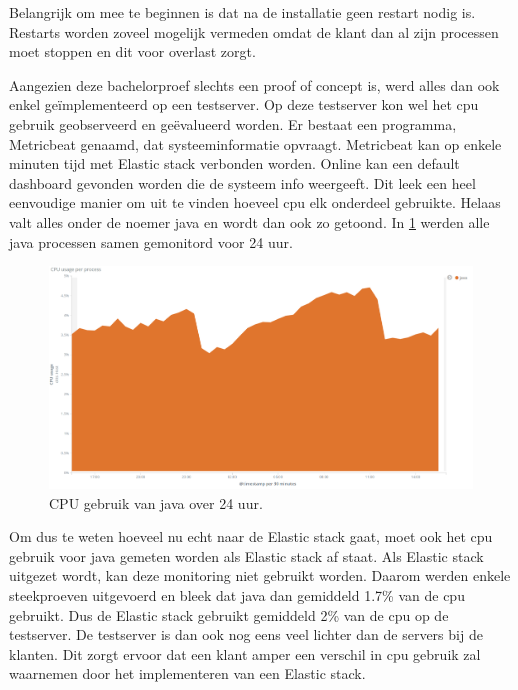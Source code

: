 Belangrijk om mee te beginnen is dat na de installatie geen restart nodig is. Restarts worden zoveel mogelijk vermeden omdat de klant dan al zijn processen moet stoppen en dit voor overlast zorgt.

Aangezien deze bachelorproef slechts een proof of concept is, werd alles dan ook enkel geïmplementeerd op een testserver. Op deze testserver kon wel het cpu gebruik geobserveerd en geëvalueerd worden. 
Er bestaat een programma, Metricbeat genaamd, dat systeeminformatie opvraagt. Metricbeat kan op enkele minuten tijd met Elastic stack verbonden worden. Online kan een default dashboard gevonden worden die de systeem info weergeeft. Dit leek een heel eenvoudige manier om uit te vinden hoeveel cpu elk onderdeel gebruikte. Helaas valt alles onder de noemer java en wordt dan ook zo getoond.
In \ref{fig:java} werden alle java processen samen gemonitord voor 24 uur. 

\begin{figure}[h]
	\includegraphics[width=16cm]{img/java1}
	\caption{CPU gebruik van java over 24 uur.}
	\label{fig:java}
\end{figure}

Om dus te weten hoeveel nu echt naar de Elastic stack gaat, moet ook het cpu gebruik voor java gemeten worden als Elastic stack af staat.
Als Elastic stack uitgezet wordt, kan deze monitoring niet gebruikt worden. 
Daarom werden enkele steekproeven uitgevoerd en bleek dat java dan gemiddeld 1.7\% van de cpu gebruikt. Dus de Elastic stack gebruikt gemiddeld 2\% van de cpu op de testserver. 
De testserver is dan ook nog eens veel lichter dan de servers bij de klanten.
Dit zorgt ervoor dat een klant amper een verschil in cpu gebruik zal waarnemen door het implementeren van een Elastic stack.


